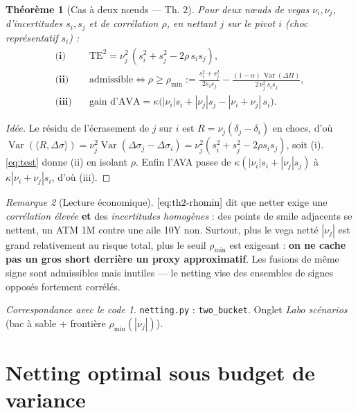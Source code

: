 \documentclass[11pt,a4paper]{article}
\newcommand{\code}[1]{\texttt{#1}}
\DeclareMathOperator{\Var}{Var}
\newcommand{\dsig}{\Delta\sigma}
\newcommand{\dPi}{\Delta\Pi}
\newcommand{\abs}[1]{\left| #1 \right|}
\theoremstyle{plain}
\newtheorem{theoreme}{Théorème}[section]
\theoremstyle{definition}
\theoremstyle{remark}
\newtheorem{remarque}[theoreme]{Remarque}
\newtheorem*{impl}{Correspondance avec le code}
\begin{document}
\begin{theoreme}[Cas à deux nœuds --- Th. 2]\label{th:two}
Pour deux nœuds de vegas $\nu_i,\nu_j$, d'incertitudes $s_i,s_j$ et de corrélation
$\rho$, en nettant $j$ sur le pivot $i$ (choc représentatif $s_i$) :
\begin{align}
\textbf{(i)}\quad & \mathrm{TE}^2 = \nu_j^2\,(s_i^2 + s_j^2 - 2\rho\, s_i s_j),
\label{eq:th2-te}\\[2pt]
\textbf{(ii)}\quad & \text{admissible} \iff
\rho \ge \rho_{\min} := \frac{s_i^2 + s_j^2}{2 s_i s_j}
- \frac{(1-\alpha)\,\Var(\dPi)}{2\,\nu_j^2\, s_i s_j},
\label{eq:th2-rhomin}\\[2pt]
\textbf{(iii)}\quad & \text{gain d'AVA} = \kappa\big(\abs{\nu_i}s_i + \abs{\nu_j}s_j
- \abs{\nu_i+\nu_j}\, s_i\big).
\label{eq:th2-gain}
\end{align}
\end{theoreme}

\begin{proof}[Idée]
Le résidu de l'écrasement de $j$ sur $i$ est $R = \nu_j(\delta_j - \delta_i)$ en chocs,
d'où $\Var(\langle R,\dsig\rangle) = \nu_j^2\Var(\dsig_j-\dsig_i) = \nu_j^2(s_i^2+s_j^2
-2\rho s_i s_j)$, soit (i). \eqref{eq:test} donne (ii) en isolant $\rho$.
Enfin l'AVA passe de $\kappa(\abs{\nu_i}s_i+\abs{\nu_j}s_j)$ à
$\kappa\abs{\nu_i+\nu_j}s_i$, d'où (iii).
\end{proof}

\begin{remarque}[Lecture économique]
$\eqref{eq:th2-rhomin}$ dit que netter exige une \emph{corrélation élevée} \textbf{et}
des \emph{incertitudes homogènes} : des points de smile adjacents se nettent, un ATM
1M contre une aile 10Y non. Surtout, plus le vega netté $\abs{\nu_j}$ est grand
relativement au risque total, plus le seuil $\rho_{\min}$ est exigeant : \textbf{on ne
cache pas un gros short derrière un proxy approximatif}. Les fusions de même signe
sont admissibles mais inutiles --- le netting vise des ensembles de signes opposés
fortement corrélés.
\end{remarque}

\begin{impl}
\code{netting.py} : \code{two\_bucket}. Onglet \emph{Labo scénarios} (bac à sable +
frontière $\rho_{\min}(\abs{\nu_j})$).
\end{impl}

\section{Netting optimal sous budget de variance}\label{sec:optimal}
\end{document}
